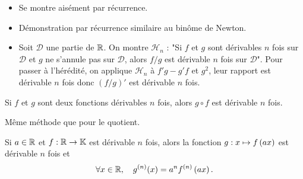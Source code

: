 \documentclass{magnolia}
\begin{document}
\begin{preuve}
\begin{itemize}
\item Se montre aisément par récurrence.
\item Démonstration par récurrence similaire au binôme de Newton.
\item Soit $\mathcal{D}$ une partie de $\mathbb{R}$. On montre $\mathcal{H}_n$ : "Si $f$ et $g$ sont dérivables $n$ fois sur $\mathcal{D}$ et $g$ ne s'annule pas sur $\mathcal{D}$, alors $f/g$ est dérivable $n$ fois sur $\mathcal{D}$".
Pour passer à l'hérédité, on applique $\mathcal{H}_n$ à $f'g-g'f$ et $g^2$, leur rapport est dérivable $n$ fois donc $(f/g)'$ est dérivable $n$ fois.
\end{itemize}

\end{preuve}

\begin{proposition}[utile=-3]
Si $f$ et $g$ sont deux fonctions dérivables $n$ fois, alors $g\circ f$ est
dérivable $n$ fois.  
\end{proposition}

\begin{preuve}
Même méthode que pour le quotient.
\end{preuve}

\begin{remarqueUnique}
\remarque Si $a\in\mathbb{R}$ et $f:\mathbb{R}\to\mathbb{K}$ est dérivable $n$ fois, alors la fonction $g:x\mapsto f\left(ax\right)$
  est dérivable $n$ fois et
  \[\forall x\in\mathbb{R} ,\quad g^{(n)}(x)=a^n f^{(n)}\left(ax\right).\]
\end{remarqueUnique}
\end{document}
